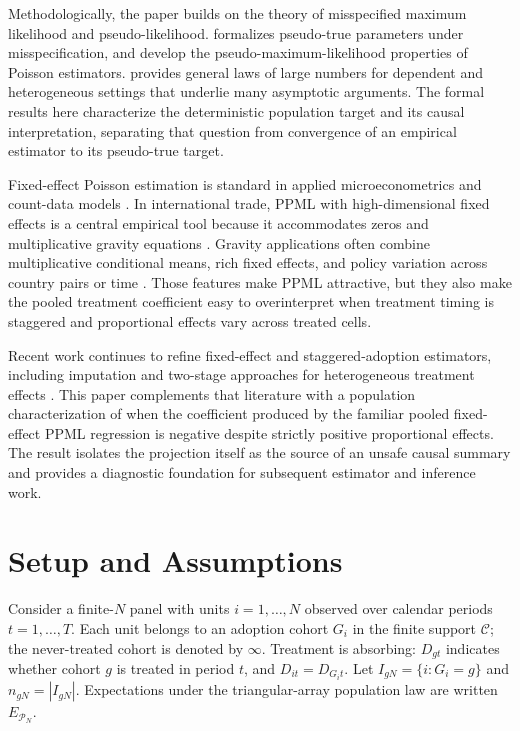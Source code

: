 \documentclass[11pt]{article}
\begin{document}
Methodologically, the paper builds on the theory of misspecified maximum likelihood and pseudo-likelihood. \citet{White1982MisspecifiedML} formalizes pseudo-true parameters under misspecification, and \citet{GourierouxMonfortTrognon1984Theory,GourierouxMonfortTrognon1984Poisson} develop the pseudo-maximum-likelihood properties of Poisson estimators. \citet{Andrews1988LLN} provides general laws of large numbers for dependent and heterogeneous settings that underlie many asymptotic arguments. The formal results here characterize the deterministic population target and its causal interpretation, separating that question from convergence of an empirical estimator to its pseudo-true target.

Fixed-effect Poisson estimation is standard in applied microeconometrics and count-data models \citep{HausmanHallGriliches1984,CameronTrivedi2013}. In international trade, PPML with high-dimensional fixed effects is a central empirical tool because it accommodates zeros and multiplicative gravity equations \citep{SantosSilvaTenreyro2006,SantosSilvaTenreyro2011,CorreiaGuimaraesZylkin2020}. Gravity applications often combine multiplicative conditional means, rich fixed effects, and policy variation across country pairs or time \citep{AndersonVanWincoop2003,HeadMayer2014,YotovPiermartiniMonteiroLarch2016,NagengastYotov2025}. Those features make PPML attractive, but they also make the pooled treatment coefficient easy to overinterpret when treatment timing is staggered and proportional effects vary across treated cells.

Recent work continues to refine fixed-effect and staggered-adoption estimators, including imputation and two-stage approaches for heterogeneous treatment effects \citep{Gardner2022,Baker2025}. This paper complements that literature with a population characterization of when the coefficient produced by the familiar pooled fixed-effect PPML regression is negative despite strictly positive proportional effects. The result isolates the projection itself as the source of an unsafe causal summary and provides a diagnostic foundation for subsequent estimator and inference work.


\section{Setup and Assumptions}

Consider a finite-\(N\) panel with units \(i=1,\ldots,N\) observed over calendar periods \(t=1,\ldots,T\). Each unit belongs to an adoption cohort \(G_i\) in the finite support \(\mathcal C\); the never-treated cohort is denoted by \(\infty\). Treatment is absorbing: \(D_{gt}\) indicates whether cohort \(g\) is treated in period \(t\), and \(D_{it}=D_{G_i t}\). Let \(I_{gN}=\{i:G_i=g\}\) and \(n_{gN}=|I_{gN}|\). Expectations under the triangular-array population law are written \(E_{\mathcal P_N}\).
\end{document}
